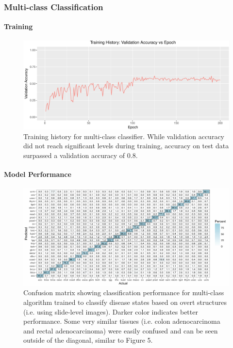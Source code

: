 \documentclass[12pt,]{article}
\let\oldparagraph\paragraph
\renewcommand{\paragraph}[1]{\oldparagraph{#1}\mbox{}}
\begin{document}
\subsubsection{Multi-class
Classification}\label{multi-class-classification-1}

\paragraph{Training}\label{training-1}

\begin{figure}[H]

{\centering \includegraphics{figure/graphics-unnamed-chunk-14-1} 

}

\caption{Training history for multi-class classifier. While validation accuracy did not reach significant levels during training, accuracy on test data surpassed a validation accuracy of 0.8.}\label{fig:unnamed-chunk-14}
\end{figure}

\paragraph{Model Performance}\label{model-performance-1}

\begin{figure}[H]

{\centering \includegraphics{figure/graphics-unnamed-chunk-15-1} 

}

\caption{Confusion matrix showing classification performance for multi-class algorithm trained to classify disease states based on overt structures (i.e. using slide-level images). Darker color indicates better performance. Some very similar tissues (i.e. colon adenocarcinoma and rectal adenocarcinoma) were easily confused and can be seen outside of the diagonal, similar to Figure 5.}\label{fig:unnamed-chunk-15}
\end{figure}
\end{document}
